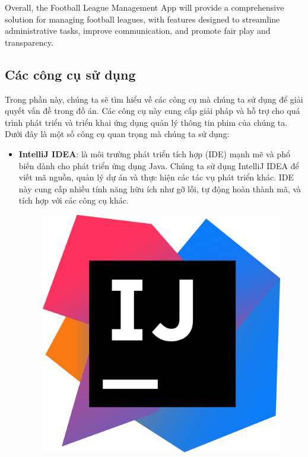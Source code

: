 \documentclass[12pt]{article}
\begin{document}
Overall, the Football League Management App will provide a comprehensive solution for managing football leagues, with features designed to streamline administrative tasks, improve communication, and promote fair play and transparency.
\subsection{Các công cụ sử dụng}
Trong phần này, chúng ta sẽ tìm hiểu về các công cụ mà chúng ta sử dụng để giải quyết vấn đề trong đồ án. Các công cụ này cung cấp giải pháp và hỗ trợ cho quá trình phát triển và triển khai ứng dụng quản lý thông tin phim của chúng ta. Dưới đây là một số công cụ quan trọng mà chúng ta sử dụng:
\begin{itemize}
    \item \textbf{IntelliJ IDEA}: là môi trường phát triển tích hợp (IDE) mạnh mẽ và phổ biến dành cho phát triển ứng dụng Java. Chúng ta sử dụng IntelliJ IDEA để viết mã nguồn, quản lý dự án và thực hiện các tác vụ phát triển khác. IDE này cung cấp nhiều tính năng hữu ích như gỡ lỗi, tự động hoàn thành mã, và tích hợp với các công cụ khác.
    \begin{figure}[H]
        \centering
        \includegraphics[scale=0.15]{Figs/IntelliJ_IDEA_Icon.svg.png}
    \end{figure}


\end{itemize}
\end{document}
